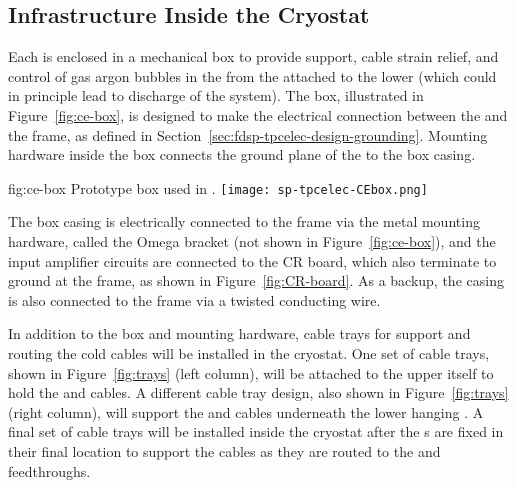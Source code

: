\subsection{Infrastructure Inside the Cryostat}
\label{sec:fdsp-tpcelec-design-infrastructure}

Each  is enclosed in a mechanical  box to provide support, cable strain
relief, and control of gas argon bubbles in the  from the  attached to the lower 
(which could in principle lead to discharge of the  system).
The  box, illustrated in Figure~\ref{fig:ce-box}, is designed to make the electrical connection 
between the  and the  frame, as defined in Section~\ref{sec:fdsp-tpcelec-design-grounding}.
Mounting hardware inside the  box connects the ground plane of the  to the box casing.

\begin{dunefigure}
{fig:ce-box}
{Prototype  box used in .}
\texttt{[image: sp-tpcelec-CEbox.png]}
\end{dunefigure}

The  box casing is electrically connected to the  frame via the metal mounting hardware,
called the Omega bracket (not shown in Figure~\ref{fig:ce-box}), 
and the input amplifier circuits are connected to the CR board, which also terminate to
ground at the  frame, as shown in Figure~\ref{fig:CR-board}.
As a backup, the casing is also connected to the  frame via a twisted conducting wire.

In addition to the  box and mounting hardware, cable trays for support and routing the cold cables will be installed in the 
cryostat. One set of cable trays, shown in Figure~\ref{fig:trays} (left column), will be attached to the upper  itself 
to hold the  and  cables. A different cable tray design, also shown in Figure~\ref{fig:trays} (right column), will support the  and  cables underneath the lower hanging . A final set of cable trays will be installed inside the 
cryostat after the s are fixed in their final location to support the cables as they are 
routed to the  and  feedthroughs.

